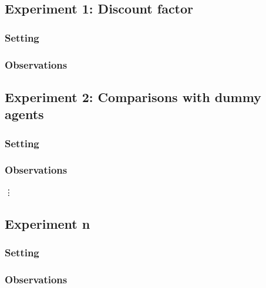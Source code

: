 \documentclass[11pt]{article}
\begin{document}
\subsection{Experiment 1: Discount factor}

\subsubsection{Setting}

\subsubsection{Observations}

\subsection{Experiment 2: Comparisons with dummy agents}

\subsubsection{Setting}

\subsubsection{Observations}

\vdots

\subsection{Experiment n}

\subsubsection{Setting}

\subsubsection{Observations}
\end{document}
